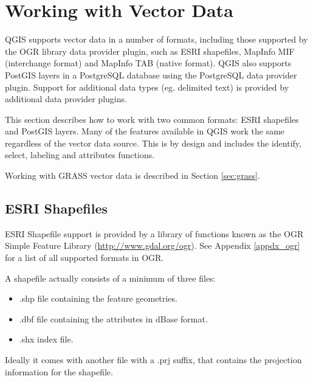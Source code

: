 
\section{Working with Vector Data}\label{label_workingvector}

QGIS supports vector data in a number of formats, including those
supported by the OGR library data provider plugin, such as ESRI shapefiles,
MapInfo MIF (interchange format)
and MapInfo TAB (native format).
QGIS also supports PostGIS
layers in a PostgreSQL database using the PostgreSQL data provider plugin.
Support for
additional data types (eg. delimited text) is provided by additional data provider plugins.

This section describes how to work with two common formats:
ESRI shapefiles and PostGIS layers. Many of the
features available in QGIS work the same regardless of the vector data source.
This is by design and includes the identify, select, labeling and attributes
functions.

Working with GRASS vector data is described in Section \ref{sec:grass}.

\subsection{ESRI Shapefiles}

ESRI Shapefile support is provided by a library of functions known as 
the OGR Simple Feature Library (\url{http://www.gdal.org/ogr}). See Appendix
\ref{appdx_ogr} for a list of all supported formats in OGR.

A shapefile actually consists of a minimum of three
files:

\begin{itemize}
\item .shp file containing the feature geometries.
\item .dbf file containing the attributes in dBase format.
\item .shx index file.
\end{itemize}

Ideally it comes with another file with a .prj suffix, that contains
the projection information for the shapefile.

